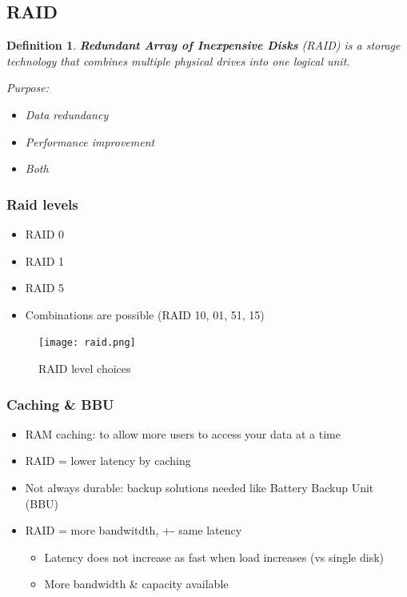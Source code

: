 \documentclass{article}
\newtheorem{theorem}{Definition}[section]
\begin{document}
\subsection{RAID}

\begin{theorem}
    \textbf{Redundant Array of Inexpensive Disks} (RAID) is a storage technology that combines multiple physical drives into one logical unit.

    Purpose:

    \begin{itemize}
        \item Data redundancy
        \item Performance improvement
        \item Both
    \end{itemize}
\end{theorem}


\subsubsection{Raid levels}

\begin{itemize}
    \item RAID 0
    \item RAID 1
    \item RAID 5
    \item Combinations are possible (RAID 10, 01, 51, 15)
\end{itemize}

\begin{figure}[H]
    \centering
    \texttt{[image: raid.png]}
    \caption{RAID level choices}
\end{figure}

\subsubsection{Caching \& BBU}

\begin{itemize}
    \item RAM caching: to allow more users to access your data at a time
    \item RAID = lower latency by caching
    \item Not always durable: backup solutions needed like Battery Backup Unit (BBU)
    \item RAID = more bandwitdth, +- same latency
    \begin{itemize}
        \item Latency does not increase as fast when load increases (vs single disk)
        \item More bandwidth \& capacity available
    \end{itemize}
\end{itemize}
\end{document}
